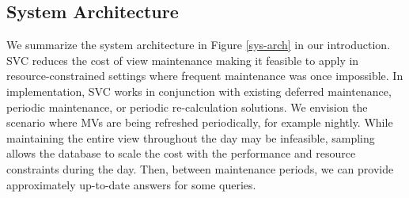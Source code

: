 \subsection{System Architecture}
We summarize the system architecture in Figure \ref{sys-arch} in our introduction.
SVC reduces the cost of view maintenance making it feasible to apply in resource-constrained settings where frequent maintenance was once impossible.
In implementation, SVC works in conjunction with existing deferred maintenance, periodic maintenance, or periodic re-calculation solutions.
We envision the scenario where MVs are being refreshed periodically, for example nightly.
While maintaining the entire view throughout the day may be infeasible, sampling allows the database to scale the cost with the performance and resource constraints during the day.
Then, between maintenance periods, we can provide approximately up-to-date answers for some queries.

 
